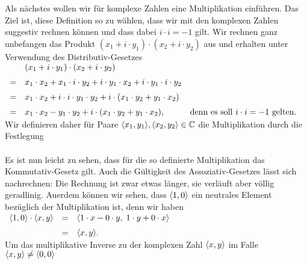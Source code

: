Als n\"{a}chstes wollen wir f\"{u}r 
komplexe Zahlen eine Multiplikation einf\"{u}hren.   Das Ziel ist,
diese Definition so zu w\"{a}hlen, dass wir mit den komplexen Zahlen suggestiv rechnen k\"{o}nnen
und dass dabei $i \cdot i = -1$ gilt.  Wir rechnen ganz unbefangen das Produkt 
$(x_1 + i \cdot y_1) \cdot (x_2 + i \cdot y_2)$ aus und erhalten unter Verwendung des
Distributiv-Gesetzes 
\\[0.2cm]
\hspace*{1.3cm}
$
\begin{array}[t]{cll}
  & (x_1 + i \cdot y_1) \cdot (x_2 + i \cdot y_2) \\[0.2cm]
= & x_1 \cdot x_2 + x_1 \cdot i \cdot y_2 + i \cdot y_1 \cdot x_2 + i \cdot y_1 \cdot i \cdot y_2
    \\[0.2cm]
= & x_1 \cdot x_2 + i \cdot i \cdot y_1 \cdot y_2 + i \cdot (x_1 \cdot y_2 + y_1 \cdot x_2) \\[0.2cm]
= & x_1 \cdot x_2 - y_1 \cdot y_2 + i \cdot (x_1 \cdot y_2 + y_1 \cdot x_2),
  & \mbox{denn es soll $i \cdot i = -1$ gelten.} 
\end{array}
$
\\[0.2cm]
Wir definieren daher f\"{u}r Paare $\pair(x_1,y_1), \pair(x_2,y_2) \in \mathbb{C}$ die Multiplikation durch
die Festlegung
\\[0.2cm]
\hspace*{1.3cm}
\colorbox{red}{}
\\[0.2cm]
Es ist nun leicht zu sehen, dass f\"{u}r die so definierte Multiplikation das Kommutativ-Gesetz gilt.
Auch die G\"{u}ltigkeit des Assoziativ-Gesetzes l\"{a}sst sich nachrechnen: Die Rechnung ist zwar etwas l\"{a}nger,
sie verl\"{a}uft aber v\"{o}llig geradlinig.  Au\3erdem k\"{o}nnen wir sehen, dass $\pair(1,0)$ ein neutrales Element
bez\"{u}glich der Multiplikation ist, denn wir haben
\\[0.2cm]
\hspace*{1.3cm}
$
\begin{array}[t]{lcll}
  \pair(1,0) \cdot \pair(x,y) & = & \pair(1 \cdot x - 0 \cdot y,\; 1 \cdot y + 0 \cdot x) \\[0.2cm]
                              & = & \pair(x, y). 
\end{array}
$
\\[0.2cm]
Um das multiplikative Inverse zu der komplexen Zahl $\pair(x,y)$ im Falle $\pair(x,y) \not= \pair(0,0)$
